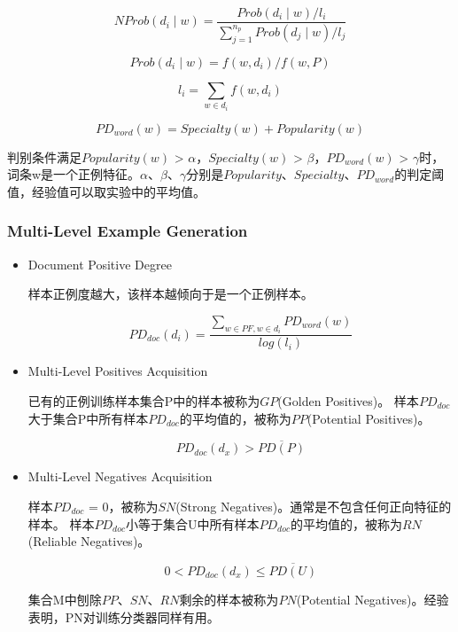 \begin{equation}
NProb(d_i \mid w) = \frac{Prob(d_i \mid w) / l_i}{\sum\limits_{j=1}^{n_p}Prob(d_j \mid w) / l_j} 
\end{equation}

\begin{equation}
Prob(d_i \mid w) = f(w,d_i)/f(w,P) 
\end{equation}

\begin{equation}
l_i = \sum\limits_{w \in d_i}f(w,d_i)
\end{equation}

\begin{equation}
PD_{word}(w) = Specialty(w) + Popularity(w)
\end{equation}

判别条件满足$Popularity(w)$ > $\alpha$，$Specialty(w)$ > $\beta$，$PD_{word}(w)$ > $\gamma$时，词条w是一个正例特征。$\alpha$、$\beta$、$\gamma$分别是$Popularity$、$Specialty$、$PD_{word}$的判定阈值，经验值可以取实验中的平均值。

\subsubsection{Multi-Level Example Generation}

\begin{itemize}
\item Document Positive Degree  

样本正例度越大，该样本越倾向于是一个正例样本。

\begin{equation}
PD_{doc}(d_i) = \frac{\sum\limits_{w \in PF, w \in d_i}PD_{word}(w)}{log(l_i)}
\end{equation}

\item Multi-Level Positives Acquisition

已有的正例训练样本集合P中的样本被称为$GP$(Golden Positives)。
样本$PD_{doc}$大于集合P中所有样本$PD_{doc}$的平均值的，被称为$PP$(Potential Positives)。

\begin{equation}
PD_{doc}(d_x) > \overline{PD(P)} 
\end{equation}

\item Multi-Level Negatives Acquisition

样本$PD_{doc}$ = 0，被称为$SN$(Strong Negatives)。通常是不包含任何正向特征的样本。
样本$PD_{doc}$小等于集合U中所有样本$PD_{doc}$的平均值的，被称为$RN$(Reliable Negatives)。

\begin{equation}
0 < PD_{doc}(d_x) \leq \overline{PD(U)}
\end{equation}

集合M中刨除$PP$、$SN$、$RN$剩余的样本被称为$PN$(Potential Negatives)。经验表明，PN对训练分类器同样有用。

\end{itemize}

